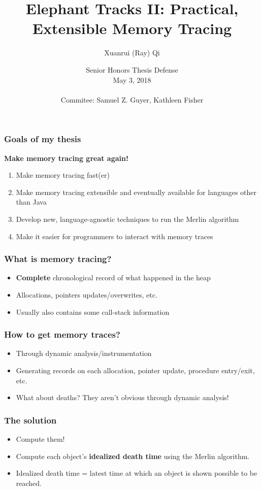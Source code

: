 \documentclass[11pt]{beamer}
\author{Xuanrui (Ray) Qi}
\title{Elephant Tracks II: Practical, Extensible Memory Tracing}
\institute{Department of Computer Science,\\Tufts University}
\date{Senior Honors Thesis Defense\\May 3, 2018\\~\\
  \small
  Commitee: Samuel Z. Guyer, Kathleen Fisher}
\begin{document}
\begin{frame}
\titlepage
\end{frame}


\begin{frame}
  \frametitle{Goals of my thesis}
  \textbf{Make memory tracing great again!}
  \begin{enumerate}
  \item Make memory tracing fast(er)
  \item Make memory tracing extensible and eventually available for
    languages other than Java
  \item Develop new, language-agnostic techniques to run the Merlin algorithm
  \item Make it easier for programmers to interact with memory traces
  \end{enumerate}
\end{frame}

\begin{frame}
  \frametitle{What is memory tracing?}
  \begin{itemize}
  \item \textbf{Complete} chronological record of what happened in the heap
  \item Allocations, pointers updates/overwrites, etc.
  \item Usually also contains some call-stack information
  \end{itemize}
\end{frame}

\begin{frame}
  \frametitle{How to get memory traces?}
  \begin{itemize}
  \item Through dynamic analysis/instrumentation
    \pause
  \item Generating records on each allocation, pointer update, procedure entry/exit, etc.
    \pause
  \item What about deaths? They aren't obvious through dynamic analysis!
  \end{itemize}
\end{frame}

\begin{frame}
  \frametitle{The solution}
  \begin{itemize}
  \item Compute them!
    \pause
  \item Compute each object's \textbf{idealized death time} using the Merlin algorithm.
    \pause
  \item Idealized death time = latest time at which an object is shown possible to be reached.
  \end{itemize}
\end{frame}
\end{document}
